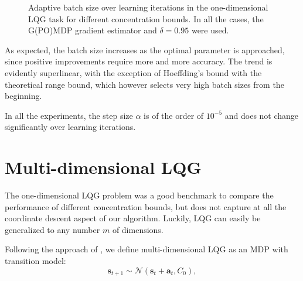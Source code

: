 {\begin{figure}[t!]
\begin{adjustbox}{center}
{	\label{fig:6}
	}
\end{adjustbox}

\caption[Adaptive batch size over learning iterations in the one-dimensional LQG task for different concentration bounds.]{Adaptive batch size over learning iterations in the one-dimensional \ac{LQG} task for different concentration bounds. In all the cases, the G(PO)MDP gradient estimator and $\delta=0.95$ were used.}
\label{fig:8}
\end{figure}
\clearpage
}

As expected, the batch size increases as the optimal parameter is approached, since positive improvements require more and more accuracy. The trend is evidently superlinear, with the exception of Hoeffding's bound with the theoretical range bound, which however selects very high batch sizes from the beginning. 

In all the experiments, the step size $\alpha$ is of the order of $10^{-5}$ and does not change significantly over learning iterations.


\section{Multi-dimensional LQG}\label{sec:lqg2d}
The one-dimensional \ac{LQG} problem was a good benchmark to compare the performance of different concentration bounds, but does not capture at all the coordinate descent aspect of our algorithm. Luckily, \ac{LQG} can easily be generalized to any number $m$ of dimensions.

Following the approach of \cite{Pirotta:2015:MRL:2888116.2888124}, we define multi-dimensional \ac{LQG} as an \ac{MDP} with transition model:
\[
	\boldsymbol{s}_{t+1} \sim \mathcal{N}(\boldsymbol{s}_t+\boldsymbol{a}_t,C_0),
\] 

